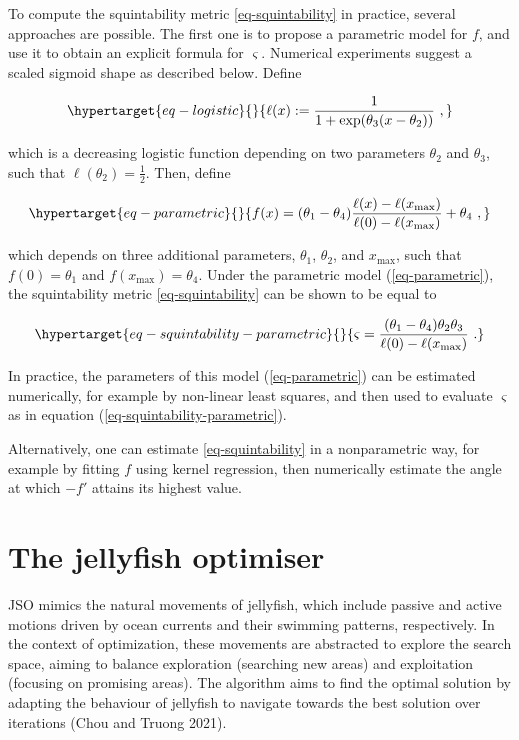 \documentclass[
  12pt,
]{interact}
\theoremstyle{plain}
\begin{document}
To compute the squintability metric \eqref{eq-squintability} in
practice, several approaches are possible. The first one is to propose a
parametric model for \(f\), and use it to obtain an explicit formula for
\(\varsigma\). Numerical experiments suggest a scaled sigmoid shape as
described below. Define

\begin{equation}\protect\hypertarget{eq-logistic}{}{
\ell(x):=\frac{1}{1+\exp(\theta_{3}(x-\theta_{2}))}\ ,
}\label{eq-logistic}\end{equation}

which is a decreasing logistic function depending on two parameters
\(\theta_2\) and \(\theta_3\), such that
\(\ell(\theta_{2})=\frac{1}{2}\). Then, define

\begin{equation}\protect\hypertarget{eq-parametric}{}{
f(x)=(\theta_{1}-\theta_{4})\frac{\ell(x)-\ell(x_{\max})}{\ell(0)-\ell(x_{\max})}+\theta_{4}\ ,
}\label{eq-parametric}\end{equation}

which depends on three additional parameters, \(\theta_1\),
\(\theta_2\), and \(x_{\max}\), such that \(f(0)=\theta_1\) and
\(f(x_{\max})=\theta_4\). Under the parametric model
(\ref{eq-parametric}), the squintability metric \eqref{eq-squintability}
can be shown to be equal to

\begin{equation}\protect\hypertarget{eq-squintability-parametric}{}{
\varsigma=\frac{(\theta_{1}-\theta_{4})\theta_{2}\theta_{3}}{\ell(0)-\ell(x_{\max})}\ .
}\label{eq-squintability-parametric}\end{equation}

In practice, the parameters of this model (\ref{eq-parametric}) can be
estimated numerically, for example by non-linear least squares, and then
used to evaluate \(\varsigma\) as in equation
(\ref{eq-squintability-parametric}).

Alternatively, one can estimate \eqref{eq-squintability} in a
nonparametric way, for example by fitting \(f\) using kernel regression,
then numerically estimate the angle at which \(-f'\) attains its highest
value.

\hypertarget{sec-JSO}{%
\section{The jellyfish optimiser}\label{sec-JSO}}

JSO mimics the natural movements of jellyfish, which include passive and
active motions driven by ocean currents and their swimming patterns,
respectively. In the context of optimization, these movements are
abstracted to explore the search space, aiming to balance exploration
(searching new areas) and exploitation (focusing on promising areas).
The algorithm aims to find the optimal solution by adapting the
behaviour of jellyfish to navigate towards the best solution over
iterations (Chou and Truong 2021).
\end{document}
